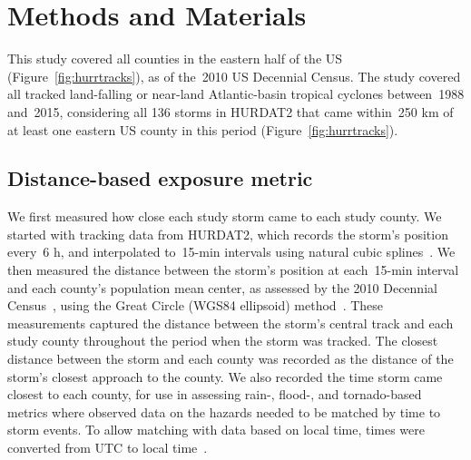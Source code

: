 \section*{Methods and Materials}

This study covered all counties in the eastern half of the \ac{US}
(Figure~\ref{fig:hurrtracks}), as of the~2010 \ac{US} Decennial Census. The
study covered all tracked land-falling or near-land Atlantic-basin tropical
cyclones between~1988 and~2015, considering all 136 storms in \ac{HURDAT2}
\parencite{landsea2013} that came within~250 \si{\kilo\metre} of at least one
eastern \ac{US} county in this period (Figure~\ref{fig:hurrtracks}). 

\begin{comment}
These data typically give measurements of
the tropical cyclone center's location [and central pressure / maximum
windspeed?] at~6-\si{\hour} intervals at synoptic times (i.e., 6:00~am,
12:00~pm, 6:00~pm, and 12:00~am \ac{UTC}); some landfalling tropical cyclones
have an additional observation at the time of landfall~\parencite{landsea2013}.
\end{comment}

\subsection*{Distance-based exposure metric}

We first measured how close each study storm came to each study county. We
started with tracking data from \ac{HURDAT2}, which records the storm's
position every~6 \si{\hour}, and interpolated to~15-\si{\minute} intervals
using natural cubic splines~\parencite{hurricaneexposure}. We then measured the
distance between the storm's position at each~15-\si{\minute} interval and each
county's population mean center, as assessed by the 2010 Decennial
Census~\parencite{countycenters}, using the Great Circle (WGS84 ellipsoid)
method~\parencite{bivand2013applied}. These measurements captured the distance
between the storm's central track and each study county throughout the period
when the storm was tracked. The closest distance between the storm and each
county was recorded as the distance of the storm's closest approach to the
county. We also recorded the time storm came closest to each county, for use in
assessing rain-, flood-, and tornado-based metrics where observed data on the
hazards needed to be matched by time to storm events.  To allow matching with
data based on local time, times were converted from \ac{UTC} to local
time~\parencite{countytimezones}.

